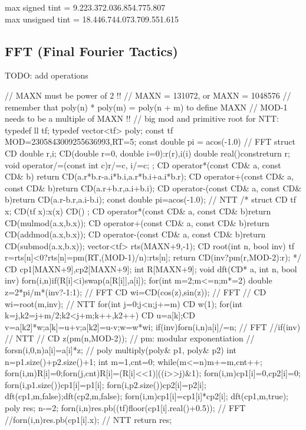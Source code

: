 \documentclass[10pt, landscape, twocolumn, a4paper, notitlepage]{article}
\begin{document}
max signed tint = 9.223.372.036.854.775.807 \\
max unsigned tint = 18.446.744.073.709.551.615
\subsection{FFT (Final Fourier Tactics)}
TODO: add operations
\begin{code}
// MAXN must be power of 2 !!
// MAXN = 131072, or MAXN = 1048576 
// remember that poly(n) * poly(m) = poly(n + m) to define MAXN
// MOD-1 needs to be a multiple of MAXN !!
// big mod and primitive root for NTT:
typedef ll tf;
typedef vector<tf> poly;
const tf MOD=2305843009255636993,RT=5;
const double pi = acos(-1.0)
// FFT
struct CD {
	double r,i;
	CD(double r=0, double i=0):r(r),i(i){}
	double real()const{return r;}
	void operator/=(const int c){r/=c, i/=c;}
};
CD operator*(const CD& a, const CD& b){
	return CD(a.r*b.r-a.i*b.i,a.r*b.i+a.i*b.r);}
CD operator+(const CD& a, const CD& b){return CD(a.r+b.r,a.i+b.i);}
CD operator-(const CD& a, const CD& b){return CD(a.r-b.r,a.i-b.i);}
const double pi=acos(-1.0);
// NTT
/*
struct CD {
	tf x;
	CD(tf x):x(x){}
	CD(){}
};
CD operator*(const CD& a, const CD& b){return CD(mulmod(a.x,b.x));}
CD operator+(const CD& a, const CD& b){return CD(addmod(a.x,b.x));}
CD operator-(const CD& a, const CD& b){return CD(submod(a.x,b.x));}
vector<tf> rts(MAXN+9,-1);
CD root(int n, bool inv){
	tf r=rts[n]<0?rts[n]=pm(RT,(MOD-1)/n):rts[n];
	return CD(inv?pm(r,MOD-2):r);
}
*/
CD cp1[MAXN+9],cp2[MAXN+9];
int R[MAXN+9];
void dft(CD* a, int n, bool inv){
	forn(i,n)if(R[i]<i)swap(a[R[i]],a[i]);
	for(int m=2;m<=n;m*=2){
		double z=2*pi/m*(inv?-1:1); // FFT
		CD wi=CD(cos(z),sin(z)); // FFT
		// CD wi=root(m,inv); // NTT
		for(int j=0;j<n;j+=m){
			CD w(1);
			for(int k=j,k2=j+m/2;k2<j+m;k++,k2++){
				CD u=a[k];CD v=a[k2]*w;a[k]=u+v;a[k2]=u-v;w=w*wi;
			}
		}
	}
	if(inv)forn(i,n)a[i]/=n; // FFT
	//if(inv){ // NTT
	//	CD z(pm(n,MOD-2)); // pm: modular exponentiation
	//	forsn(i,0,n)a[i]=a[i]*z;
	//}
}
poly multiply(poly& p1, poly& p2){
	int n=p1.size()+p2.size()+1;
	int m=1,cnt=0;
	while(m<=n)m+=m,cnt++;
	forn(i,m){R[i]=0;forn(j,cnt)R[i]=(R[i]<<1)|((i>>j)&1);}
	forn(i,m)cp1[i]=0,cp2[i]=0;
	forn(i,p1.size())cp1[i]=p1[i];
	forn(i,p2.size())cp2[i]=p2[i];
	dft(cp1,m,false);dft(cp2,m,false);
	forn(i,m)cp1[i]=cp1[i]*cp2[i];
	dft(cp1,m,true);
	poly res;
	n-=2;
	forn(i,n)res.pb((tf)floor(cp1[i].real()+0.5)); // FFT
	//forn(i,n)res.pb(cp1[i].x); // NTT
	return res;
}
\end{code}
\end{document}
